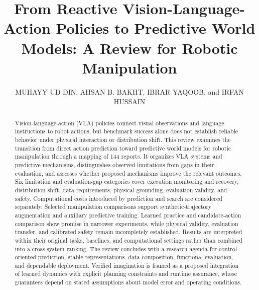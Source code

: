 \documentclass{ieeeaccess}
\begin{document}

\title{
From Reactive Vision-Language-Action Policies to Predictive World Models:
A Review for Robotic Manipulation}
\author{\uppercase{Muhayy Ud Din}, 
\uppercase{Ahsan B. Bakht}, 
\uppercase{Ibrar Yaqoob},
and \uppercase{Irfan Hussain}
}
\address[1]{Khalifa University Center for Autonomous Robotic Systems (KUCARS),
Khalifa University, Abu Dhabi 127788, United Arab Emirates.}
\address[2]{Artificial Intelligence and Cyber Futures Centre, Charles Sturt University, Bathurst, NSW, Australia.}



\begin{abstract}
\textcolor[RGB]{104,48,148}{Vision-language-action (VLA) policies connect visual observations and language instructions to robot actions, but benchmark success alone does not establish reliable behavior under physical interaction or distribution shift. This review examines the transition from direct action prediction toward predictive world models for robotic manipulation through a mapping of 144 reports. It organizes VLA systems and predictive mechanisms, distinguishes observed limitations from gaps in their evaluation, and assesses whether proposed mechanisms improve the relevant outcomes. Six limitation and evaluation-gap categories cover execution monitoring and recovery, distribution shift, data requirements, physical grounding, evaluation validity, and safety. Computational costs introduced by prediction and search are considered separately. Selected manipulation comparisons support synthetic-trajectory augmentation and auxiliary predictive training. Learned practice and candidate-action comparison show promise in narrower experiments, while physical validity, evaluation transfer, and calibrated safety remain incompletely established. Results are interpreted within their original tasks, baselines, and computational settings rather than combined into a cross-system ranking. The review concludes with a research agenda for control-oriented prediction, stable representations, data composition, functional evaluation, and dependable deployment. Verified imagination is framed as a proposed integration of learned dynamics with explicit planning constraints and runtime assurance, whose guarantees depend on stated assumptions about model error and operating conditions.}
\end{abstract}
\end{document}

